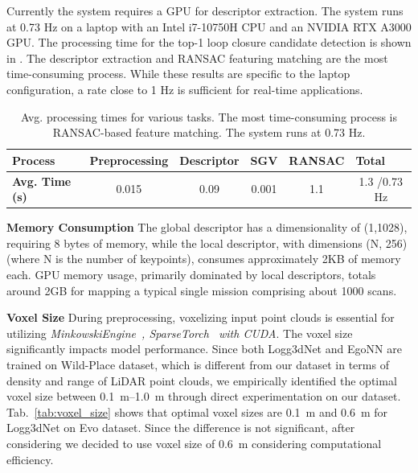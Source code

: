\hspace{0.5em} Currently the system requires a GPU for descriptor extraction. The system runs at 0.73 Hz on a laptop with an Intel i7-10750H CPU and an NVIDIA RTX A3000 GPU. The processing time for the top-1 loop closure candidate detection is shown in . The descriptor extraction and RANSAC featuring matching are the most time-consuming process. While these results are specific to the laptop configuration, a rate close to 1 Hz is sufficient for real-time applications. \vspace{1pt}
\begin{table}[htbp]
  \centering
  \small
  \begin{tabular}{@{}llllll@{}}
  \toprule
  \textbf{Process} & \textbf{Preprocessing} & \textbf{Descriptor} & \textbf{SGV} & \textbf{RANSAC} & \textbf{Total} \\ \midrule
  \textbf{Avg. Time (s)} & \multicolumn{1}{c}{0.015} & \multicolumn{1}{c}{0.09} & \multicolumn{1}{c}{0.001} & \multicolumn{1}{c}{1.1} & \multicolumn{1}{c}{1.3 /0.73 Hz} \\ %
  \bottomrule
  \end{tabular}
  \caption{Avg. processing times for various tasks. The most time-consuming process is RANSAC-based feature matching. The system runs at 0.73 Hz.}
  \label{tab:my-table}
\end{table}

\noindent \textbf{Memory Consumption}\hspace{0.5em} The global descriptor has a dimensionality of (1,1028), requiring 8 bytes of memory, while the local descriptor, with dimensions (N, 256) (where N is the number of keypoints), consumes approximately 2KB of memory each. GPU memory usage, primarily dominated by local descriptors, totals around 2GB for mapping a typical single mission comprising about 1000 scans.
\vspace{7pt}

\noindent \textbf{Voxel Size}\hspace{0.5em} During preprocessing, voxelizing input point clouds is essential for utilizing \emph{MinkowskiEngine~\cite{choy20194cvpr}, SparseTorch~\cite{tang2023MICRO} with CUDA}. The voxel size significantly impacts model performance. Since both Logg3dNet and EgoNN are trained on Wild-Place dataset, which is different from our dataset in terms of density and range of LiDAR point clouds, we empirically identified the optimal voxel size between \SIrange{0.1}{1.0}{\meter} through direct experimentation on our dataset. Tab.~\ref{tab:voxel_size} shows that optimal voxel sizes are \SI{0.1}{\meter} and \SI{0.6}{\meter} for Logg3dNet on Evo dataset. Since the difference is not significant, after considering we decided to use voxel size of \SI{0.6}{\meter} considering computational efficiency.\\

